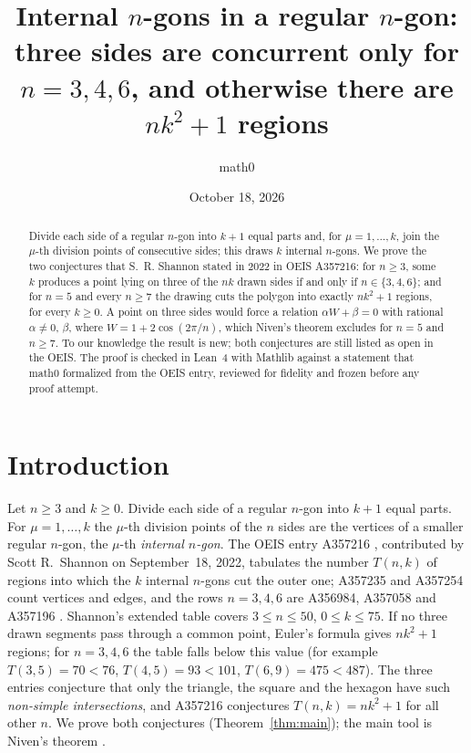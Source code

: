 \documentclass[11pt]{amsart}
\title[Internal $n$-gons in a regular $n$-gon (OEIS A357216)]{Internal $n$-gons in a regular $n$-gon: three sides are concurrent only for $n=3,4,6$, and otherwise there are $nk^2+1$ regions}
\author{math0}
\date{October 18, 2026}
\theoremstyle{plain}
\theoremstyle{definition}
\begin{document}
\begin{abstract}
Divide each side of a regular $n$-gon into $k+1$ equal parts and, for $\mu=1,\dots,k$, join the $\mu$-th division points of consecutive sides; this draws $k$ internal $n$-gons. We prove the two conjectures that S.~R. Shannon stated in 2022 in OEIS A357216: for $n\ge3$, some $k$ produces a point lying on three of the $nk$ drawn sides if and only if $n\in\{3,4,6\}$; and for $n=5$ and every $n\ge7$ the drawing cuts the polygon into exactly $nk^2+1$ regions, for every $k\ge0$. A point on three sides would force a relation $\alpha W+\beta=0$ with rational $\alpha\ne0$, $\beta$, where $W=1+2\cos(2\pi/n)$, which Niven's theorem excludes for $n=5$ and $n\ge7$. To our knowledge the result is new; both conjectures are still listed as open in the OEIS. The proof is checked in Lean~4 with Mathlib against a statement that math0 formalized from the OEIS entry, reviewed for fidelity and frozen before any proof attempt.
\end{abstract}
\maketitle

\section{Introduction}

Let $n\ge3$ and $k\ge0$. Divide each side of a regular $n$-gon into $k+1$ equal parts. For $\mu=1,\dots,k$ the $\mu$-th division points of the $n$ sides are the vertices of a smaller regular $n$-gon, the $\mu$-th \emph{internal $n$-gon}. The OEIS entry A357216 \cite{A357216}, contributed by Scott R.~Shannon on September~18, 2022, tabulates the number $T(n,k)$ of regions into which the $k$ internal $n$-gons cut the outer one; A357235 \cite{A357235} and A357254 \cite{A357254} count vertices and edges, and the rows $n=3,4,6$ are A356984, A357058 and A357196 \cite{A356984,A357058,A357196}. Shannon's extended table covers $3\le n\le 50$, $0\le k\le75$. If no three drawn segments pass through a common point, Euler's formula gives $nk^2+1$ regions; for $n=3,4,6$ the table falls below this value (for example $T(3,5)=70<76$, $T(4,5)=93<101$, $T(6,9)=475<487$). The three entries conjecture that only the triangle, the square and the hexagon have such \emph{non-simple intersections}, and A357216 conjectures $T(n,k)=nk^2+1$ for all other $n$. We prove both conjectures (Theorem~\ref{thm:main}); the main tool is Niven's theorem \cite{Niven}.
\end{document}

